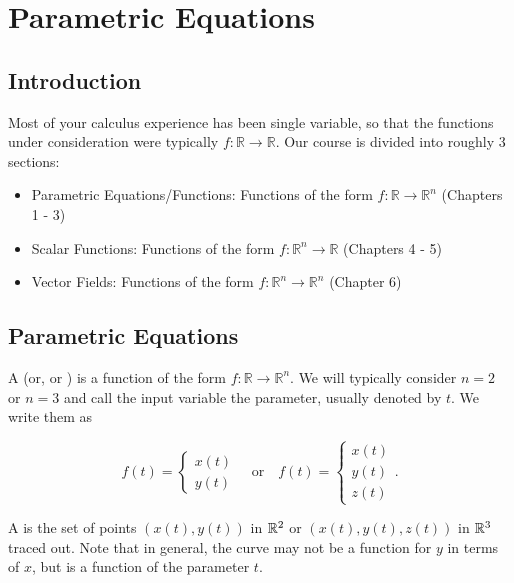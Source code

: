 \section{Parametric Equations}

\subsection{Introduction}
Most of your calculus experience has been single variable, so that the functions under consideration were typically \(f : \mathbb{R} \to \mathbb{R}\). Our course is divided into roughly 3 sections:
\begin{itemize}
    \item Parametric Equations/Functions: Functions of the form \(f : \mathbb{R} \to \mathbb{R}^n\) (Chapters 1 - 3)
    \item Scalar Functions: Functions of the form \(f : \mathbb{R}^n \to \mathbb{R}\) (Chapters 4 - 5)
    \item Vector Fields: Functions of the form \(f : \mathbb{R}^n \to \mathbb{R}^n\) (Chapter 6)
\end{itemize}

\subsection{Parametric Equations}

A  (or,  or ) is a function of the form \(f \colon \mathbb{R} \to \mathbb{R}^{n}\). We will typically consider \(n = 2\) or \(n = 3\) and call the input variable the parameter, usually denoted by \(t\). We write them as

\[
    f(t) =
    \begin{cases}
        x(t) \\
        y(t)
    \end{cases}
    \quad \text{or} \quad
    f(t) =
    \begin{cases}
        x(t) \\
        y(t) \\
        z(t)
    \end{cases}.
\]

A  is the set of points \((x(t), y(t))\) in \(\mathbb{R}^{2}\) or \((x(t), y(t), z(t))\) in \(\mathbb{R}^{3}\) traced out. Note that in general, the curve may not be a function for \(y\) in terms of \(x\), but is a function of the parameter \(t\).

